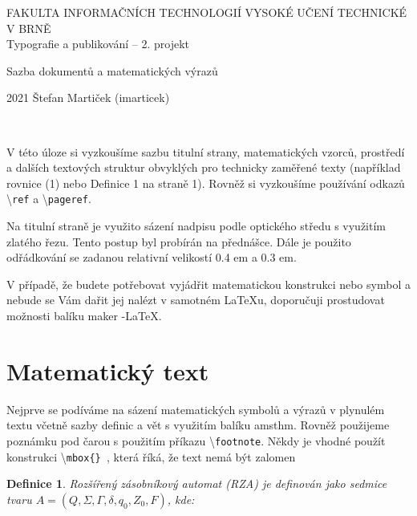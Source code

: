 \documentclass[a4paper, twocolumn, 10pt]{article}
\begin{document}
\begin{titlepage}
\begin{center}
    \huge
    \textsc{FAKULTA INFORMAČNÍCH TECHNOLOGIÍ
VYSOKÉ UČENÍ TECHNICKÉ V BRNĚ}
    \\[84mm]
    Typografie a publikování – 2. projekt

Sazba dokumentů a matematických výrazů
    \vfill
\end{center}

{\LARGE 2021 \hfill Štefan Martiček (imarticek)}

\end{titlepage}

\textbf{}

~\

V této úloze si vyzkoušíme sazbu titulní strany, matematických vzorců, prostředí a dalších textových struktur obvyklých pro technicky zaměřené texty (například rovnice (1)
nebo Definice 1 na straně 1). Rovněž si vyzkoušíme používání odkazů  \textbackslash \texttt{ref} a \textbackslash \texttt{pageref}.

Na titulní straně je využito sázení nadpisu podle optického středu s využitím zlatého řezu. Tento postup byl
probírán na přednášce. Dále je použito odřádkování se
zadanou relativní velikostí 0.4 em a 0.3 em.

V případě, že budete potřebovat vyjádřit matematickou
konstrukci nebo symbol a nebude se Vám dařit jej nalézt
v samotném \LaTeX u, doporučuji prostudovat možnosti balíku maker \AmS-\LaTeX.

\section{Matematický text}
Nejprve se podíváme na sázení matematických symbolů
a výrazů v plynulém textu včetně sazby definic a vět s využitím balíku amsthm. Rovněž použijeme poznámku pod
čarou s použitím příkazu \textbackslash \texttt{footnote}. Někdy je vhodné
použít konstrukci \textbackslash \texttt{mbox\{\}\ }, která říká, že text nemá být
zalomen

\newtheorem{theorem1}{Definice}
\begin{theorem1}
Rozšířený zásobníkový automat \textit{(RZA) je definován jako sedmice tvaru $A = (Q, \Sigma, \Gamma, \delta,  q_0, Z_0, F)$,
kde:}
\end{theorem1}
\end{document}
